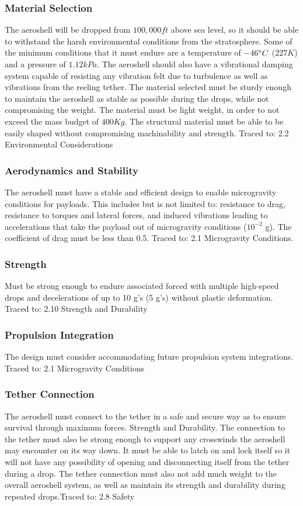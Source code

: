 \subsubsection*{Material Selection}
\indent\indent The aeroshell will be dropped from $100,000 ft$ above sea level, so it should be able to withstand the harsh environmental conditions from the stratosphere.  Some of the minimum conditions that it must endure are a temperature of $-46\degree C$ ($227 K$) and a pressure of $1.12 kPa$. The aeroshell should also have a vibrational damping system capable of resisting any vibration felt due to turbulence as well as vibrations from the reeling tether. The material selected must be sturdy enough to maintain the aeroshell as stable as possible during the drops, while not compromising the weight. The material must be light weight, in order to not exceed the mass budget of $400 Kg$. The structural material must be able to be easily shaped without compromising machinability and strength. Traced to: 2.2 Environmental Considerations

\subsubsection*{Aerodynamics and Stability}
\indent\indent The aeroshell must have a stable and efficient design to enable microgravity conditions for payloads. This includes but is not limited to: resistance to drag, resistance to torques and lateral forces, and induced vibrations leading to accelerations that take the payload out of microgravity conditions ($10^{\minus2}$ g). The coefficient of drag must be less than 0.5. Traced to: 2.1 Microgravity Conditions. 

\subsubsection*{Strength}
\indent\indent Must be strong enough to endure associated forced with multiple high-speed drops and decelerations of up to 10 g’s (5 g’s) without plastic deformation. Traced to: 2.10 Strength and Durability

\subsubsection*{Propulsion Integration}
\indent\indent The design must consider accommodating future propulsion system integrations. Traced to: 2.1 Microgravity Conditions

\subsubsection*{Tether Connection}
\indent\indent The aeroshell must connect to the tether in a safe and secure way as to ensure survival through maximum forces. Strength and Durability. The connection to the tether must also be strong enough to support any crosswinds the aeroshell may encounter on its way down. It must be able to latch on and lock itself so it will not have any possibility of opening and disconnecting itself from the tether during a drop. The tether connection must also not add much weight to the overall aeroshell system, as well as maintain its strength and durability during repeated drops.Traced to: 2.8 Safety

